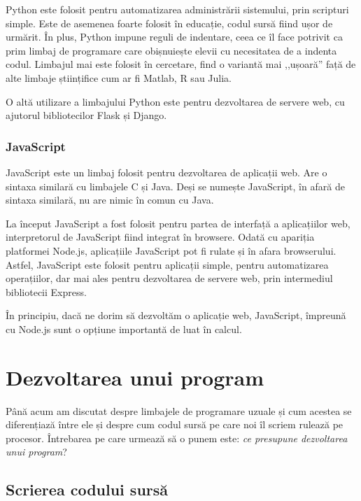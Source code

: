 Python este folosit pentru automatizarea administrării sistemului, prin scripturi simple.
Este de asemenea foarte folosit în educație, codul sursă fiind ușor de urmărit.
În plus, Python impune reguli de indentare, ceea ce îl face potrivit ca prim limbaj de programare care obișnuiește elevii cu necesitatea de a indenta codul.
Limbajul mai este folosit în cercetare, find o variantă mai ,,ușoară'' față de alte limbaje științifice cum ar fi Matlab, R sau Julia.

O altă utilizare a limbajului Python este pentru dezvoltarea de servere web, cu ajutorul bibliotecilor Flask și Django.

\subsubsection{JavaScript}
\label{sec:appdev:hybrid-lang:js}

JavaScript este un limbaj folosit pentru dezvoltarea de aplicații web.
Are o sintaxa similară cu limbajele C și Java.
Deși se numește JavaScript, în afară de sintaxa similară, nu are nimic în comun cu Java.

La început JavaScript a fost folosit pentru partea de interfață a aplicațiilor web, interpretorul de JavaScript fiind integrat în browsere.
Odată cu apariția platformei Node.js, aplicațiile JavaScript pot fi rulate și în afara browserului.
Astfel, JavaScript este folosit pentru aplicații simple, pentru automatizarea operațiilor, dar mai ales pentru dezvoltarea de servere web, prin intermediul bibliotecii Express.

În principiu, dacă ne dorim să dezvoltăm o aplicație web, JavaScript, împreună cu Node.js sunt o opțiune importantă de luat în calcul.

\section{Dezvoltarea unui program}
\label{sec:appdev:dev}

Până acum am discutat despre limbajele de programare uzuale și cum acestea se diferențiază între ele și despre cum codul sursă pe care noi îl scriem rulează pe procesor.
Întrebarea pe care urmează să o punem este: \textit{ce presupune dezvoltarea unui program}?

\subsection{Scrierea codului sursă}
\label{sec:appdev:dev-stages:write}

